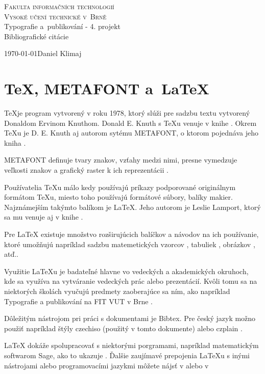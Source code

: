 \documentclass[a4paper,10pt]{article}
\begin{document}
\begin{titlepage}

\begin{center}
\Huge
\textsc{Fakulta informačních technologií \\
Vysoké učení technické v~Brně} \\
\LARGE
Typografie a~publikování - 4. projekt \\
\Huge Bibliografické citácie
\end{center}
{\LARGE \today \hfill Daniel Klimaj}
\end{titlepage}

\section*{\TeX, METAFONT a~\LaTeX}

\TeX je program vytvorený v roku 1978, ktorý slúži pre sadzbu textu vytvorený Donaldom Ervinom Knuthom. Donald E. Knuth s \TeX u venuje v knihe \cite{Knuth1}. Okrem \TeX u je D. E. Knuth aj autorom sytému METAFONT, o ktorom pojednáva jeho kniha \cite{Knuth2}.

METAFONT definuje tvary znakov, vzťahy medzi nimi, presne vymedzuje veľkosti znakov a grafický raster k ich reprezentácii \cite{Sbornik2}.

Používatelia \TeX u málo kedy používajú príkazy podporované originálnym formátom \TeX u, miesto toho používajú formátové súbory, balíky makier. Najznámejším takýmto balíkom je \LaTeX. Jeho autorom je Leslie Lamport, ktorý sa mu venuje aj v knihe \cite{Lamport1}.

Pre \LaTeX{} existuje množstvo rozširujúcich balíčkov a návodov na ich používanie, ktoré umožňujú napríklad sadzbu matemetických vzorcov \cite{Amsmath}, tabuliek \cite{Tables}, obrázkov \cite{Graphix}, atď..

Využitie \LaTeX u je badateľné hlavne vo vedeckých a akademických okruhoch, kde sa využíva na vytváranie vedeckých prác alebo prezentácií. Kvôli tomu sa na niektorých školách vyučujú predmety zaoberajúce sa ním, ako napríklad Typografie a publikování na FIT VUT v Brne \cite{KrenaITY}.

Dôležitým nástrojom pri práci s dokumentami je Bibtex. Pre český jazyk možno použiť napríklad štýly czechiso (použitý v tomto dokumente) alebo czplain \cite{Thesis1}.

\LaTeX{} dokáže spolupracovať s niektorými porgramami, napríklad matematickým softwarom Sage, ako to ukazuje \cite{Sbornik1}. Ďalšie zaujímavé prepojenia \LaTeX u s inými nástrojami alebo programovacími jazykmi môžete nájsť v \cite{Thesis2} alebo v \cite{Thesis3}

\newpage

\def\refname{Literatúra}

\end{document}
